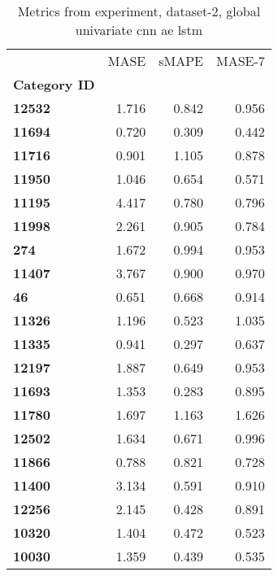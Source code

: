 \begin{table}[h]
\centering
\caption{Metrics from experiment, dataset-2, global univariate cnn ae lstm}
\label{table:global-univariate-cnn-ae-lstm-dataset-2}
\begin{tabular}{lrrr}
\toprule
{} &   MASE &  sMAPE &  MASE-7 \\
\textbf{Category ID} &        &        &         \\
\midrule
\textbf{12532      } &  1.716 &  0.842 &   0.956 \\
\textbf{11694      } &  0.720 &  0.309 &   0.442 \\
\textbf{11716      } &  0.901 &  1.105 &   0.878 \\
\textbf{11950      } &  1.046 &  0.654 &   0.571 \\
\textbf{11195      } &  4.417 &  0.780 &   0.796 \\
\textbf{11998      } &  2.261 &  0.905 &   0.784 \\
\textbf{274        } &  1.672 &  0.994 &   0.953 \\
\textbf{11407      } &  3.767 &  0.900 &   0.970 \\
\textbf{46         } &  0.651 &  0.668 &   0.914 \\
\textbf{11326      } &  1.196 &  0.523 &   1.035 \\
\textbf{11335      } &  0.941 &  0.297 &   0.637 \\
\textbf{12197      } &  1.887 &  0.649 &   0.953 \\
\textbf{11693      } &  1.353 &  0.283 &   0.895 \\
\textbf{11780      } &  1.697 &  1.163 &   1.626 \\
\textbf{12502      } &  1.634 &  0.671 &   0.996 \\
\textbf{11866      } &  0.788 &  0.821 &   0.728 \\
\textbf{11400      } &  3.134 &  0.591 &   0.910 \\
\textbf{12256      } &  2.145 &  0.428 &   0.891 \\
\textbf{10320      } &  1.404 &  0.472 &   0.523 \\
\textbf{10030      } &  1.359 &  0.439 &   0.535 \\
\bottomrule
\end{tabular}
\end{table}
